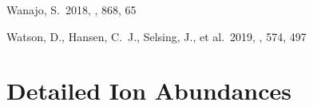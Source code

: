 \documentclass[twocolumn, twocolappendix]{aastex63}
\begin{document}
\begin{thebibliography}{}


 Wanajo, S.\ 2018, \apj, 868, 65






 Watson, D., Hansen, C.~J., Selsing, J., et al.\ 2019, \nat, 574, 497


















\end{thebibliography}


\appendix{}

\section{Detailed Ion Abundances}\label{app:ion_abunds}



\end{document}
